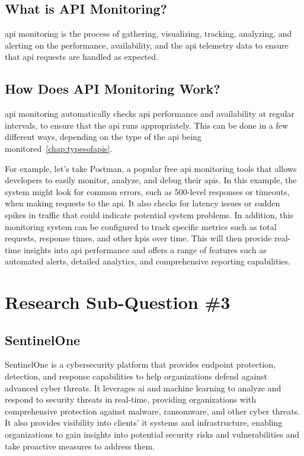 \begin{multicols}{2}
      \subsection{What is API Monitoring?}
      \acrshort{api} monitoring is the process of gathering, visualizing, tracking, analyzing, and alerting on the 
      performance, availability, and the \acrshort{api} telemetry data to ensure that \acrshort{api} requests are 
      handled as expected. 
      \subsection{How Does API Monitoring Work?}
      \acrshort{api} monitoring automatically checks \acrshort{api} performance and availability at regular intervals,
      to ensure that the \acrshort{api} runs appropriately. This can be done in a few different ways, depending on the
      type of the \acrshort{api} being monitored~\ref{chap:typesofapis}.

      For example, let's take Postman, a popular free \acrshort{api} monitoring tools that allows developers to easily 
      monitor, analyze, and debug their \acrshort{api}s. In this example, the system might look for common errors, such 
      as 500-level responses or timeouts, when making requests to the \acrshort{api}. It also checks for latency issues 
      or sudden spikes in traffic that could indicate potential system problems. In addition, this monitoring system can 
      be configured to track specific metrics such as total requests, response times, and other \acrshort{kpi}s over time. 
      This will then provide real-time insights into \acrshort{api} performance and offers a range of features such as 
      automated alerts, detailed analytics, and comprehensive reporting capabilities.
      \section{Research Sub-Question \#3}
      \subsection{SentinelOne} %
      SentinelOne is a cybersecurity platform that provides endpoint protection, detection, and response capabilities to 
      help organizations defend against advanced cyber threats. It leverages \acrlong{ai} and machine learning to analyze 
      and respond to security threats in real-time, providing organizations with comprehensive protection against malware,
      ransomware, and other cyber threats. It also provides visibility into clients' \acrshort{it} systems and infrastructure,
      enabling organizations to gain insights into potential security risks and vulnerabilities and take proactive measures 
      to address them.

\end{multicols}
